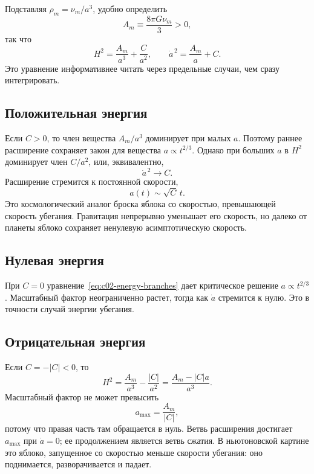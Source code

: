 Подставляя \(\rho_m=\nu_m/a^3\), удобно определить
\begin{equation}
A_m\equiv\frac{8\pi G\nu_m}{3}>0,
\end{equation}
так что
\begin{equation}
H^2=\frac{A_m}{a^3}+\frac{C}{a^2},
\qquad
\dot a^{\,2}=\frac{A_m}{a}+C.
\label{eq:c02-energy-branches}
\end{equation}
Это уравнение информативнее читать через предельные случаи, чем сразу интегрировать.

\subsection{Положительная энергия}

Если \(C>0\), то член вещества \(A_m/a^3\) доминирует при малых \(a\). Поэтому раннее расширение сохраняет закон для вещества \(a\propto t^{2/3}\). Однако при больших \(a\) в \(H^2\) доминирует член \(C/a^2\), или, эквивалентно,
\begin{equation}
\dot a^{\,2}\longrightarrow C.
\end{equation}
Расширение стремится к постоянной скорости,
\begin{equation}
a(t)\sim\sqrt C\,t.
\label{eq:c02-positive-late}
\end{equation}
Это космологический аналог броска яблока со скоростью, превышающей скорость убегания. Гравитация непрерывно уменьшает его скорость, но далеко от планеты яблоко сохраняет ненулевую асимптотическую скорость.

\subsection{Нулевая энергия}

При \(C=0\) уравнение~\eqref{eq:c02-energy-branches} дает критическое решение \(a\propto t^{2/3}\). Масштабный фактор неограниченно растет, тогда как \(\dot a\) стремится к нулю. Это в точности случай энергии убегания.

\subsection{Отрицательная энергия}

Если \(C=-|C|<0\), то
\begin{equation}
H^2=\frac{A_m}{a^3}-\frac{|C|}{a^2}
=\frac{A_m-|C|a}{a^3}.
\label{eq:c02-negative-energy}
\end{equation}
Масштабный фактор не может превысить
\begin{equation}
a_{\max}=\frac{A_m}{|C|},
\label{eq:c02-amax}
\end{equation}
потому что правая часть там обращается в нуль. Ветвь расширения достигает \(a_{\max}\) при \(\dot a=0\); ее продолжением является ветвь сжатия. В ньютоновской картине это яблоко, запущенное со скоростью меньше скорости убегания: оно поднимается, разворачивается и падает.

